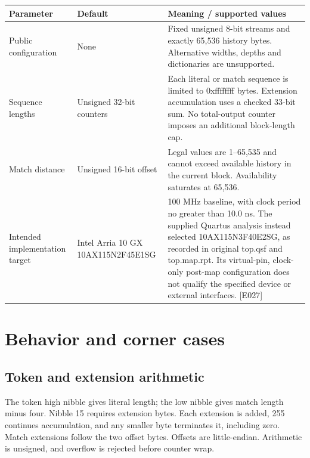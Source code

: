 \documentclass[11pt,a4paper]{article}
\begin{document}
{\small\renewcommand{\arraystretch}{1.18}\begin{longtable}{@{}L{0.22\textwidth}|L{0.21\textwidth}|L{0.49\textwidth}@{}}\toprule

\textbf{Parameter} & \textbf{Default} & \textbf{Meaning /\allowbreak{} supported values}\\\midrule\endhead

Public configuration & None & Fixed unsigned 8-bit streams and exactly 65,\allowbreak{}536 history bytes. Alternative widths,\allowbreak{} depths and dictionaries are unsupported.\\[2pt]\hline

Sequence lengths & Unsigned 32-bit counters & Each literal or match sequence is limited to 0xffffff\allowbreak{}ff bytes. Extension accumulation uses a checked 33-bit sum. No total-output counter imposes an additional block-length cap.\\[2pt]\hline

Match distance & Unsigned 16-bit offset & Legal values are 1–65,\allowbreak{}535 and cannot exceed available history in the current block. Availability saturates at 65,\allowbreak{}536.\\[2pt]\hline

Intended implementation target & Intel Arria 10 GX 10AX115N\allowbreak{}2F45E1SG & 100 MHz baseline,\allowbreak{} with clock period no greater than 10.0 ns. The supplied Quartus analysis instead selected 10AX115N\allowbreak{}3F40E2SG,\allowbreak{} as recorded in original top.qsf and top.map.rpt. Its virtual-pin,\allowbreak{} clock-only post-map configuration does not qualify the specified device or external interfaces. [\allowbreak{}E027]\allowbreak{}\\[2pt]\hline

\bottomrule\end{longtable}}

\section{Behavior and corner cases}

\subsection{Token and extension arithmetic}

The token high nibble gives literal length; the low nibble gives match length minus four. Nibble 15 requires extension bytes. Each extension is added,\allowbreak{} 255 continues accumulation,\allowbreak{} and any smaller byte terminates it,\allowbreak{} including zero. Match extensions follow the two offset bytes. Offsets are little-endian. Arithmetic is unsigned,\allowbreak{} and overflow is rejected before counter wrap.
\end{document}
